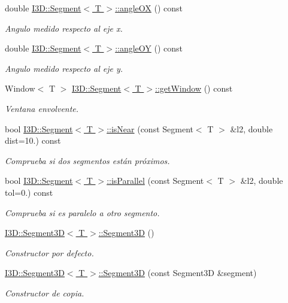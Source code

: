 \begin{DoxyCompactItemize}
double \hyperlink{group___geometric_entities_ga911ebe69ce3cc5e6a486ef573d515866}{I3\+D\+::\+Segment$<$ T $>$\+::angle\+OX} () const 
\begin{DoxyCompactList}\small\item\em Angulo medido respecto al eje x. \end{DoxyCompactList}\item 
double \hyperlink{group___geometric_entities_ga324da1babfedb681fd7068fdc58d763b}{I3\+D\+::\+Segment$<$ T $>$\+::angle\+OY} () const 
\begin{DoxyCompactList}\small\item\em Angulo medido respecto al eje y. \end{DoxyCompactList}\item 
Window$<$ T $>$ \hyperlink{group___geometric_entities_ga3e11e0ecacba2003a023a21943693263}{I3\+D\+::\+Segment$<$ T $>$\+::get\+Window} () const 
\begin{DoxyCompactList}\small\item\em Ventana envolvente. \end{DoxyCompactList}\item 
bool \hyperlink{group___geometric_entities_ga59115064a0b57956175099eb3ff213ff}{I3\+D\+::\+Segment$<$ T $>$\+::is\+Near} (const Segment$<$ T $>$ \&l2, double dist=10.) const 
\begin{DoxyCompactList}\small\item\em Comprueba si dos segmentos están próximos. \end{DoxyCompactList}\item 
bool \hyperlink{group___geometric_entities_ga7a4bcb31c98bdb2e239bdb64073e8874}{I3\+D\+::\+Segment$<$ T $>$\+::is\+Parallel} (const Segment$<$ T $>$ \&l2, double tol=0.) const 
\begin{DoxyCompactList}\small\item\em Comprueba si es paralelo a otro segmento. \end{DoxyCompactList}\item 
\hyperlink{group___geometric_entities_ga726c1cdb80b816445604fc035f0b709b}{I3\+D\+::\+Segment3\+D$<$ T $>$\+::\+Segment3D} ()
\begin{DoxyCompactList}\small\item\em Constructor por defecto. \end{DoxyCompactList}\item 
\hyperlink{group___geometric_entities_gad0a6b6c727b4f675429acb7a28518cbd}{I3\+D\+::\+Segment3\+D$<$ T $>$\+::\+Segment3D} (const Segment3D \&segment)
\begin{DoxyCompactList}\small\item\em Constructor de copia. \end{DoxyCompactList}\item 

\end{DoxyCompactItemize}
